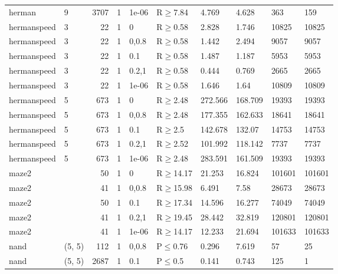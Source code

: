 \begin{longtable}{llrrllllll}
 herman        & 9        &   	3707 & 1 & 1e-06 & R$\geq$7.84  & 4.769   & 4.628    & 363    & 159    \\
 hermanspeed   & 3        &     	22 & 1 & 0     & R$\geq$0.58  & 2.828   & 1.746    & 10825  & 10825  \\
 hermanspeed   & 3        &     	22 & 1 & 0,0.8 & R$\geq$0.58  & 1.442   & 2.494    & 9057   & 9057   \\
 hermanspeed   & 3        &     	22 & 1 & 0.1   & R$\geq$0.58  & 1.487   & 1.187    & 5953   & 5953   \\
 hermanspeed   & 3        &     	22 & 1 & 0.2,1 & R$\geq$0.58  & 0.444   & 0.769    & 2665   & 2665   \\
 hermanspeed   & 3        &     	22 & 1 & 1e-06 & R$\geq$0.58  & 1.646   & 1.64     & 10809  & 10809  \\
 hermanspeed   & 5        &    	673 & 1 & 0     & R$\geq$2.48  & 272.566 & 168.709  & 19393  & 19393  \\
 hermanspeed   & 5        &    	673 & 1 & 0,0.8 & R$\geq$2.48  & 177.355 & 162.633  & 18641  & 18641  \\
 hermanspeed   & 5        &    	673 & 1 & 0.1   & R$\geq$2.5   & 142.678 & 132.07   & 14753  & 14753  \\
 hermanspeed   & 5        &    	673 & 1 & 0.2,1 & R$\geq$2.52  & 101.992 & 118.142  & 7737   & 7737   \\
 hermanspeed   & 5        &    	673 & 1 & 1e-06 & R$\geq$2.48  & 283.591 & 161.509  & 19393  & 19393  \\
 maze2         &          &     	50 & 1 & 0     & R$\geq$14.17 & 21.253  & 16.824   & 101601 & 101601 \\
 maze2         &          &     	41 & 1 & 0,0.8 & R$\geq$15.98 & 6.491   & 7.58     & 28673  & 28673  \\
 maze2         &          &     	50 & 1 & 0.1   & R$\geq$17.34 & 14.596  & 16.277   & 74049  & 74049  \\
 maze2         &          &     	41 & 1 & 0.2,1 & R$\geq$19.45 & 28.442  & 32.819   & 120801 & 120801 \\
 maze2         &          &     	41 & 1 & 1e-06 & R$\geq$14.17 & 12.233  & 21.694   & 101633 & 101633 \\
 nand          & (5, 5)   &    	112 & 1 & 0,0.8 & P$\leq$0.76  & 0.296   & 7.619    & 57     & 25     \\
 nand          & (5, 5)   &   	2687 & 1 & 0.1   & P$\leq$0.5   & 0.141   & 0.743    & 125    & 1      \\

\end{longtable}
